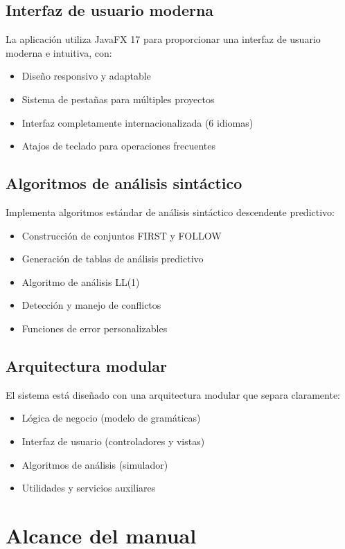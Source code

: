 \subsection{Interfaz de usuario moderna}
La aplicación utiliza JavaFX 17 para proporcionar una interfaz de usuario moderna e intuitiva, con:
\begin{itemize}
    \item Diseño responsivo y adaptable
    \item Sistema de pestañas para múltiples proyectos
    \item Interfaz completamente internacionalizada (6 idiomas)
    \item Atajos de teclado para operaciones frecuentes
\end{itemize}

\subsection{Algoritmos de análisis sintáctico}
Implementa algoritmos estándar de análisis sintáctico descendente predictivo:
\begin{itemize}
    \item Construcción de conjuntos FIRST y FOLLOW
    \item Generación de tablas de análisis predictivo
    \item Algoritmo de análisis LL(1)
    \item Detección y manejo de conflictos
    \item Funciones de error personalizables
\end{itemize}

\subsection{Arquitectura modular}
El sistema está diseñado con una arquitectura modular que separa claramente:
\begin{itemize}
    \item Lógica de negocio (modelo de gramáticas)
    \item Interfaz de usuario (controladores y vistas)
    \item Algoritmos de análisis (simulador)
    \item Utilidades y servicios auxiliares
\end{itemize}

\section{Alcance del manual}

